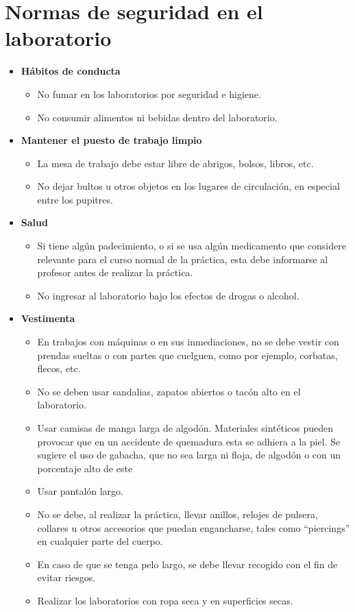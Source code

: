 \documentclass{report}
\begin{document}
\chapter{Normas de seguridad en el laboratorio}

\begin{itemize}
\item \textbf{Hábitos de conducta}\\
\begin{itemize}
\item No fumar en los laboratorios por seguridad e higiene.
\item No consumir alimentos ni bebidas dentro del laboratorio.
\end{itemize}

\item \textbf{Mantener el puesto de trabajo limpio}\\
\begin{itemize}
\item La mesa de trabajo debe estar libre de abrigos, bolsos, libros, etc.
\item No dejar bultos u otros objetos en los lugares de circulación, en especial
entre los pupitres.
\end{itemize}

\item \textbf{Salud}\\
\begin{itemize}
\item Si tiene algún padecimiento, o si se usa algún medicamento que
considere relevante para el curso normal de la práctica, esta debe
informarse al profesor antes de realizar la práctica.
\item No ingresar al laboratorio bajo los efectos de drogas o alcohol.
\end{itemize}

\item \textbf{Vestimenta}\\
\begin{itemize}
\item En trabajos con máquinas o en sus inmediaciones, no se debe vestir
con prendas sueltas o con partes que cuelguen, como por ejemplo,
corbatas, flecos, etc.
\item No se deben usar sandalias, zapatos abiertos o tacón alto en el
laboratorio.
\item Usar camisas de manga larga de algodón. Materiales sintéticos pueden
provocar que en un accidente de quemadura esta se adhiera a la piel.
Se sugiere el uso de gabacha, que no sea larga ni floja, de algodón o
con un porcentaje alto de este
\item Usar pantalón largo.
\item No se debe, al realizar la práctica, llevar anillos, relojes de pulsera,
collares u otros accesorios que puedan engancharse, tales como
“piercings” en cualquier parte del cuerpo.
\item En caso de que se tenga pelo largo, se debe llevar recogido con el fin de
evitar riesgos.
\item Realizar los laboratorios con ropa seca y en superficies secas.
\end{itemize}


\end{itemize}
\end{document}
